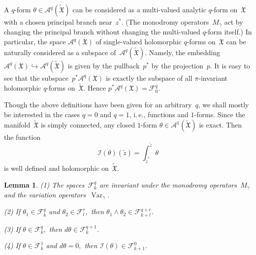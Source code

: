 \documentclass[reqno,tbtags,12pt]{amsart}
\numberwithin{equation}{section}
\newcommand{\FX}{\mathfrak{X}}
\newcommand{\tFX}{\widetilde{\mathfrak{X}}}
\newcommand{\CF}{\mathcal{F}}
\newcommand{\A}{\mathcal{A}}
\newcommand{\I}{\mathcal{I}}
\newcommand{\tz}{\tilde{z}}
\newcommand{\Var}{\mathop{\mathrm{Var}}\nolimits}
\newtheorem{lem}[theorem]{Lemma}
\theoremstyle{definition}
\begin{document}
A $q$-form $\theta\in\A^q(\tFX)$ can be considered as a multi-valued analytic $q$-form on~$\FX$  with a chosen principal branch near~$z^*$. (The monodromy operators~$M_{\gamma}$ act by changing the principal branch without changing the multi-valued $q$-form itself.) In particular, the space $\A^q(\FX)$ of single-valued holomorphic $q$-forms on~$\FX$ can be naturally considered as a subspace of~$\A^q(\tFX)$. Namely, the embedding $\A^q(\FX)\hookrightarrow\A^q(\tFX)$ is given by the pullback~$p^*$ by the projection~$p$. It is easy to see that the subspace~$p^*\A^q(\FX)$ is exactly the subspace of all $\pi$-invariant holomorphic $q$-forms on~$\tFX$. Hence $p^*\A^q(\FX)=\CF^q_0$.  




Though the above definitions have been given for an arbitrary~$q$, we shall mostly be interested in the cases $q=0$ and $q=1$, i.\,e., functions and $1$-forms.
Since the manifold~$\tFX$ is simply connected, any closed $1$-form $\theta\in\A^1(\tFX)$ is exact. 
Then the function 
\begin{equation*}
\I(\theta)(\tz)=\int_{\tz^*}^{\tz}\theta
\end{equation*}
is well defined and holomorphic on~$\tFX$.


\begin{lem}\label{lem_properties}
\textnormal{(1)} The spaces~$\CF_k^q$ are invariant under the monodromy operators~$M_{\gamma}$ and the variation operators~$\Var_{\gamma}$.

\textnormal{(2)} If\/ $\theta_1\in\CF_k^{q}$ and $\theta_2\in\CF_l^{r},$ then $\theta_1\wedge\theta_2\in\CF_{k+l}^{q+r}$. 

\textnormal{(3)} If\/ $\theta\in\CF_k^{q},$ then $d\theta\in\CF_{k}^{q+1}$.



\textnormal{(4)} If\/ $\theta\in\CF_k^{1}$ and $d\theta=0,$ then $\I(\theta)\in\CF_{k+1}^{0}$. 
\end{lem}
\end{document}
